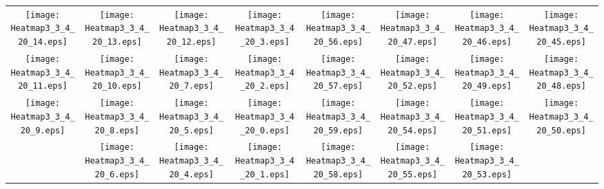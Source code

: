 \documentclass{standalone}
\begin{document}
\begin{tabular}{ *8{c} }
\texttt{[image: Heatmap3\_3\_4\_20\_14.eps]} & \texttt{[image: Heatmap3\_3\_4\_20\_13.eps]} & \texttt{[image: Heatmap3\_3\_4\_20\_12.eps]} & \texttt{[image: Heatmap3\_3\_4\_20\_3.eps]} & \texttt{[image: Heatmap3\_3\_4\_20\_56.eps]} & \texttt{[image: Heatmap3\_3\_4\_20\_47.eps]} & \texttt{[image: Heatmap3\_3\_4\_20\_46.eps]} & \texttt{[image: Heatmap3\_3\_4\_20\_45.eps]} \\
\texttt{[image: Heatmap3\_3\_4\_20\_11.eps]} & \texttt{[image: Heatmap3\_3\_4\_20\_10.eps]} & \texttt{[image: Heatmap3\_3\_4\_20\_7.eps]} & \texttt{[image: Heatmap3\_3\_4\_20\_2.eps]} & \texttt{[image: Heatmap3\_3\_4\_20\_57.eps]} & \texttt{[image: Heatmap3\_3\_4\_20\_52.eps]} & \texttt{[image: Heatmap3\_3\_4\_20\_49.eps]} & \texttt{[image: Heatmap3\_3\_4\_20\_48.eps]} \\
\texttt{[image: Heatmap3\_3\_4\_20\_9.eps]} & \texttt{[image: Heatmap3\_3\_4\_20\_8.eps]} & \texttt{[image: Heatmap3\_3\_4\_20\_5.eps]} & \texttt{[image: Heatmap3\_3\_4\_20\_0.eps]} & \texttt{[image: Heatmap3\_3\_4\_20\_59.eps]} & \texttt{[image: Heatmap3\_3\_4\_20\_54.eps]} & \texttt{[image: Heatmap3\_3\_4\_20\_51.eps]} & \texttt{[image: Heatmap3\_3\_4\_20\_50.eps]} \\
 & \texttt{[image: Heatmap3\_3\_4\_20\_6.eps]} & \texttt{[image: Heatmap3\_3\_4\_20\_4.eps]} & \texttt{[image: Heatmap3\_3\_4\_20\_1.eps]} & \texttt{[image: Heatmap3\_3\_4\_20\_58.eps]} & \texttt{[image: Heatmap3\_3\_4\_20\_55.eps]} & \texttt{[image: Heatmap3\_3\_4\_20\_53.eps]} &  
\end{tabular}
\end{document}
